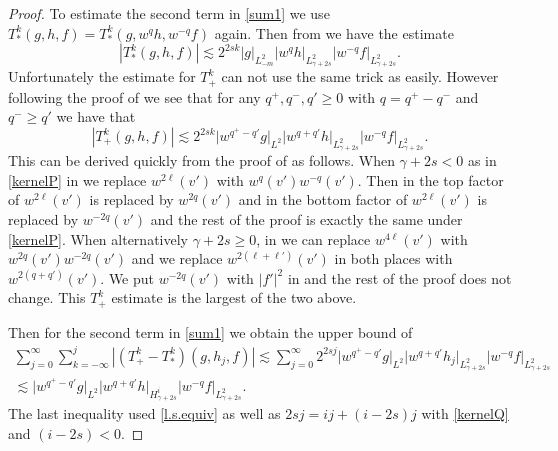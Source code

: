 \documentclass{amsart}
\numberwithin{equation}{section}
\begin{document}
\begin{proof}
To estimate the second term in \eqref{sum1} we use 
$
{T^{k}_{*}}(g,h,f)
=
{T^{k}_{*}}(g, w^{q} h, w^{-{q}} f)
$
again. 
Then from 
 \cite[Proposition 3.2]{gsNonCut0}
 we have the estimate
 $$
  \left| {T^{k}_{*}}(g,h,f) \right| 
  \lesssim 
  2^{2sk}  {|} g{|}_{L^2_{-m}} {|} w^{q} h{|}_{L^2_{\gamma+2s}}
 {|} w^{-{q}} f{|}_{L^2_{\gamma+2s}}.
 $$
 Unfortunately the estimate for ${T^{k}_{+}}$ can not use the same trick as easily.  However following 
the proof of \cite[Proposition 3.3]{gsNonCut0} we see that for any ${q}^+, {q}^-, {q}' \ge 0$ with ${q} = {q}^+ - {q}^-$ and ${q}^-\ge {q}'$ we have that
$$
\left|  {T^{k}_{+}}(g,h,f)  \right| \lesssim   
2^{2sk} 
 {|}  w^{{q}^+ - {q}'} g{|}_{L^2} 
{|} w^{{q} + {q}'} h{|}_{L^2_{\gamma + 2s}} 
{|} w^{-{q}} f{|}_{L^2_{\gamma + 2s}}.
$$
This can be derived quickly from the proof of \cite[Proposition 3.3]{gsNonCut0} as follows.  When $\gamma + 2s < 0$ as in \eqref{kernelP} in \cite[(3.14)]{gsNonCut0} we replace $w^{2\ell}(v')$ with $w^{q}(v') w^{-{q}}(v')$.  Then in the top factor of \cite[(3.15)]{gsNonCut0}  $w^{2\ell}(v')$ is replaced by  $w^{2{q}}(v')$ and in the bottom factor of \cite[(3.15)]{gsNonCut0} $w^{2\ell}(v')$ is replaced by  $w^{-2{q}}(v')$ and the rest of the proof is exactly the same under \eqref{kernelP}.  When alternatively $\gamma + 2s \ge 0$, in \cite[(3.16)]{gsNonCut0}
we can replace $w^{4\ell}(v')$ with $w^{2{q}}(v') w^{-2{q}}(v')$ and we replace $w^{2(\ell+\ell')}(v')$ in both places with 
$w^{2({q}+{q}')}(v')$.  We put $w^{-2{q}}(v')$ with $|f'|^2$ in \cite[(3.16)]{gsNonCut0} and the rest of the proof does not change. This ${T^{k}_{+}}$ estimate is the largest of the two above.

Then for the second term in \eqref{sum1} we obtain the upper bound of
\begin{gather*}
\sum_{j=0}^\infty \sum_{k=-\infty}^j  \left| ({T^{k}_{+}} - {T^{k}_{*}})(g,h_j,f) \right|
\lesssim  
\sum_{j=0}^\infty
2^{2sj} 
 {|}  w^{{q}^+ - {q}'} g{|}_{L^2} 
{|} w^{{q} + {q}'} h_j{|}_{L^2_{\gamma + 2s}} 
{|} w^{-{q}} f{|}_{L^2_{\gamma + 2s}}
\\
\lesssim  
 {|}  w^{{q}^+ - {q}'} g{|}_{L^2} 
{|} w^{{q} + {q}'} h{|}_{H^{i}_{\gamma + 2s}} 
{|} w^{-{q}} f{|}_{L^2_{\gamma + 2s}}.
\end{gather*}
The last inequality used \eqref{l.s.equiv} as well as 
$2sj = {i} j +({i}-2s)j$ with \eqref{kernelQ} and $({i}-2s) <0$.


\end{proof}
\end{document}
